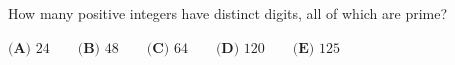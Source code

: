 How many positive integers have distinct digits, all of which are prime?

$\textbf{(A) }24\qquad\textbf{(B) }48\qquad\textbf{(C) }64\qquad\textbf{(D) }120\qquad\textbf{(E) }125$
